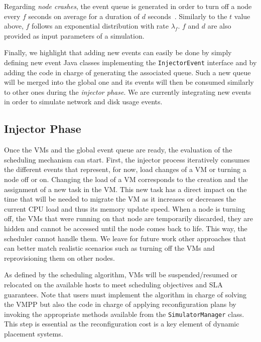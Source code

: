 Regarding \emph{node crashes}, the event queue is generated in order to turn off a
node every $f$ seconds on average for a duration of $d$ seconds~\cite{datacenterAsComputer}.
Similarly to the $t$ value above, $f$ follows an exponential
distribution with rate $\lambda_f$.
$f$ and $d$ are also provided as
input parameters of a simulation.

Finally, we highlight that adding new events can easily be done by simply defining new event Java
classes implementing the \texttt{InjectorEvent} interface and by
adding the code in charge of generating the associated queue. Such a
new queue will be merged into the global one and its events will then be
consumed similarly to other ones during the \emph{injector phase}.
We are currently integrating new events in order to simulate network
and disk usage events.

\subsection{Injector Phase}

Once the VMs and the global event queue are ready, the evaluation of
the scheduling mechanism can start. First, the injector process
iteratively consumes the different events that represent, for now,
load changes of a VM or turning a node off or on. Changing the load of
a VM corresponds to the creation and the assignment of a new \sg task
in the VM. This new task has a direct impact on the time that will be
needed to migrate the VM as it increases or decreases the current CPU
load and thus %
its memory update speed.
When a node is turning off, the VMs that were running on that node are
temporarily discarded, \ie they are hidden and cannot be accessed
until the node comes back to life. This way, the scheduler cannot
handle them.
We leave for future work other approaches that can better
match realistic scenarios such as turning off the VMs and
reprovisioning them on other nodes.
%

As defined by the scheduling algorithm, VMs will be suspended/resumed
or relocated on the available hosts to meet scheduling objectives and
SLA guarantees.  Note that users must implement the algorithm in
charge of solving the VMPP but also the code in charge of applying
reconfiguration plans by invoking the appropriate methods available
from the \texttt{SimulatorManager} class. This step is essential as
the reconfiguration cost is a key element of dynamic placement
systems.

